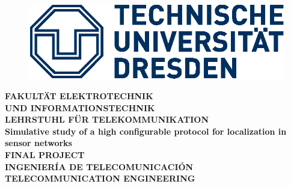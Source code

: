 \begin{figure}[top]
 \begin{center}
  \includegraphics[scale=1]{logo_tud.eps}
 \end{center}
\end{figure}
\begin{center}
 \vspace{0.2cm}
 \Large{\textbf{FAKULT\"AT ELEKTROTECHNIK\\ UND INFORMATIONSTECHNIK}}\\
 \vspace{0.5cm}
 \Large{\textbf{LEHRSTUHL F\"UR TELEKOMMUNIKATION}}\\
 \vspace{2cm}
 \Huge{\textbf{Simulative study of a high configurable protocol for localization in sensor networks}}\\
 \vspace{2cm}
 \Large{\textbf{FINAL PROJECT}}\\
 \vspace{1cm}
 \large{\textbf{INGENIER\'IA DE TELECOMUNICACI\'ON}}\\
 \vspace{0,2cm}
 \large{\textbf{TELECOMMUNICATION ENGINEERING}}\\
\end{center}

\vspace{2,2cm}
\centerline{ }
\vspace{0.2cm}
\centerline{ }
\vspace{0.2cm}
\centerline{ }
\vspace{0.2cm}
\centerline{ }


